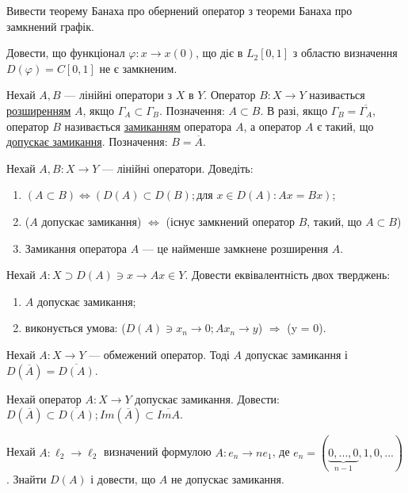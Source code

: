 \begin{exercise}
    Вивести теорему Банаха про обернений оператор з теореми Банаха про 
    замкнений графік.
\end{exercise}

\begin{exercise}
    Довести, що функціонал $\varphi: x \rightarrow x(0)$, що діє в 
    $L_2[0, 1]$ з областю визначення $D(\varphi) = C[0, 1]$ не є 
    замкненим.
\end{exercise}

\begin{theory}
    Нехай $A, B$ --- лінійні оператори з $X$ в $Y$. Оператор $B: X 
    \rightarrow Y$ називається \ul{розширенням} $A$, якщо $\Gamma_A 
    \subset \Gamma_B$. Позначення: $A \subset B$. В разі, якщо 
    $\Gamma_B = \overline{\Gamma_A}$, оператор $B$ називається 
    \ul{замиканням} оператора $A$, а оператор $A$ є такий, що 
    \ul{допускає замикання}. Позначення: $B = \overline{A}$.
\end{theory}

\begin{exercise}
    Нехай $A, B: X \rightarrow Y$ --- лінійні оператори. Доведіть:
    \begin{enumerate}
        \item $(A \subset B) \Leftrightarrow (D(A) \subset D(B); 
        \text{для }x \in D(A): Ax = Bx)$;
        \item ($A$ допускає замикання) $\Leftrightarrow$ (існує 
        замкнений оператор $B$, такий, що $A \subset B$)
        \item Замикання оператора $A$ --- це найменше замкнене 
        розширення $A$.
    \end{enumerate}
\end{exercise}

\begin{exercise}
    Нехай $A: X \supset D(A) \ni x \rightarrow Ax \in Y$. Довести 
    еквівалентність двох тверджень:
    \begin{enumerate}
        \item $A$ допускає замикання;
        \item виконується умова: ($D(A) \ni x_n \rightarrow 0; 
        Ax_n \rightarrow y$) $\Rightarrow$ (y = 0).
    \end{enumerate}
\end{exercise}

\begin{exercise}
    Нехай $A: X \rightarrow Y$ --- обмежений оператор. Тоді $A$ допускає 
    замикання і $D(\overline{A}) = \overline{D(A)}$.
\end{exercise}

\begin{exercise}
    Нехай оператор $A: X \rightarrow Y$ допускає замикання. Довести:
    $D(\overline{A}) \subset \overline{D(A)}; Im(\overline{A}) \subset 
    \overline{ImA}$.
\end{exercise}

\begin{exercise}
    Нехай $A: \ell_2 \rightarrow \ell_2$ визначений формулою $A: e_n 
    \rightarrow ne_1$, де $e_n = (\underbrace{0, ..., 0}_{n-1}, 1, 0, ...)$. 
    Знайти $D(A)$ і довести, що $A$ не допускає замикання.
\end{exercise}
